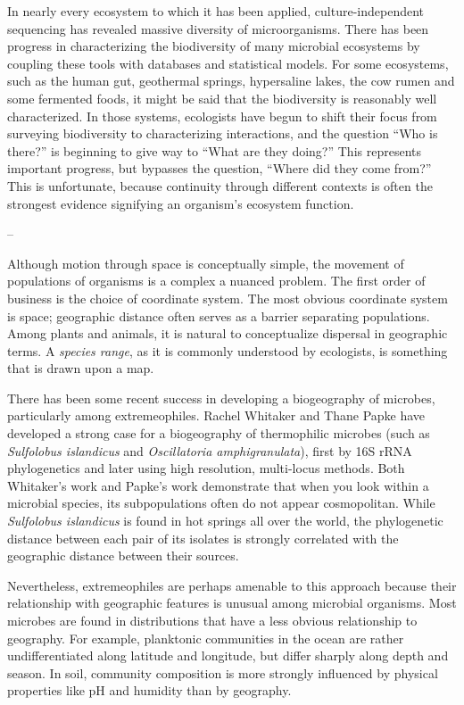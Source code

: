 In nearly every ecosystem to which it has been applied, culture-independent sequencing has revealed massive diversity of microorganisms. There has been progress in characterizing the biodiversity of many microbial ecosystems by coupling these tools with databases and statistical models. For some ecosystems, such as the human gut, geothermal springs, hypersaline lakes, the cow rumen and some fermented foods, it might be said that the biodiversity is reasonably well characterized. In those systems, ecologists have begun to shift their focus from surveying biodiversity to characterizing interactions, and the question ``Who is there?'' is beginning to give way to ``What are they doing?'' This represents important progress, but bypasses the question, ``Where did they come from?'' This is unfortunate, because continuity through different contexts is often the strongest evidence signifying an organism's ecosystem function.

--

Although motion through space is conceptually simple, the movement of populations of organisms is a complex a nuanced problem. The first order of business is the choice of coordinate system. The most obvious coordinate system is space; geographic distance often serves as a barrier separating populations. Among plants and animals, it is natural to conceptualize dispersal in geographic terms. A {\em species range}, as it is commonly understood by ecologists, is something that is drawn upon a map. 

There has been some recent success in developing a biogeography of microbes, particularly among extremeophiles. Rachel Whitaker and Thane Papke have developed a strong case for a biogeography of thermophilic microbes (such as {\em Sulfolobus islandicus} and {\em Oscillatoria amphigranulata}), first by 16S rRNA phylogenetics and later using high resolution, multi-locus methods. Both Whitaker's work and Papke's work demonstrate that when you look within a microbial species, its subpopulations often do not appear cosmopolitan. While {\em Sulfolobus islandicus} is found in hot springs all over the world, the phylogenetic distance between each pair of its isolates is strongly correlated with the geographic distance between their sources.

Nevertheless, extremeophiles are perhaps amenable to this approach because their relationship with geographic features is unusual among microbial organisms. Most microbes are found in distributions that have a less obvious relationship to geography. For example, planktonic communities in the ocean are rather undifferentiated along latitude and longitude, but differ sharply along depth and season. In soil, community composition is more strongly influenced by physical properties like pH and humidity than by geography.

